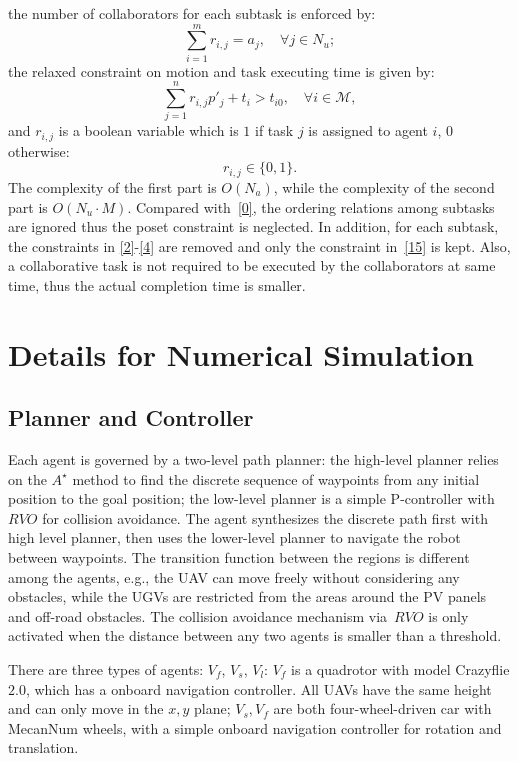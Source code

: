 the number of collaborators for each subtask is enforced by:
\begin{equation}
\sum_{i=1}^{m}r_{i,j} = a_{j},\quad  \forall j \in N_u;
\label{15}
\end{equation}
the relaxed constraint on motion and task executing time is given by:
\begin{equation}
\sum_{j=1}^{n}r_{i,j}p'_j +t_i > t_{i0}, \quad \forall i \in \mathcal{M},
\label{16}
\end{equation}
and $r_{i,j}$ is a boolean variable which is $1$ if task $j$ is assigned to agent $i$,
$0$ otherwise:
\begin{equation}
r_{i,j} \in\{0,1\}.
\label{17}
\end{equation}
The complexity of the first part is $O(N_a)$, while the complexity of
the second part is $O(N_u\cdot M)$.
Compared with~\eqref{0}, the ordering relations among subtasks are ignored
thus the poset constraint is neglected. In addition,
for each subtask, the constraints in \eqref{2}-\eqref{4} are removed
and only the constraint in~\eqref{15} is kept.
Also, a collaborative task is not required to be executed by the collaborators
at same time, thus the actual completion time is smaller.

\section{Details for Numerical Simulation}
\subsection{Planner and Controller}
Each agent is governed by a two-level path planner:
the high-level planner relies on the $A^\star$ method to find the
discrete sequence of waypoints from any initial position to the goal position;
the low-level planner is a simple P-controller with~$RVO$ for collision avoidance.
The agent synthesizes the discrete path first with high level planner,
then uses the lower-level planner to navigate the robot between waypoints.
The transition function between the regions is different among the agents, e.g.,
the UAV can move freely without considering any obstacles,
while the UGVs are restricted from the areas around the PV panels and off-road obstacles.
The collision avoidance mechanism via~$RVO$ is only activated
when the distance between any two agents is smaller than a threshold.

There are three types of agents: $V_f$, $V_s$, $V_l$:
$V_f$ is a quadrotor with model Crazyflie $2.0$,
which has a onboard navigation controller.
All UAVs have the same height and can only move in the $x,y$ plane;
$V_s, V_f$ are both four-wheel-driven car with  MecanNum wheels, with
a simple onboard navigation controller for rotation and translation.


